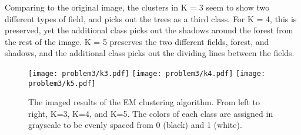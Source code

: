 \documentclass[12pt]{article}%
\begin{document}
\begin{itemize}
Comparing to the original image, the clusters in K = 3 seem to show two different types of field, and picks out the trees as a third class. For K = 4, this is preserved, yet the additional class picks out the shadows around the forest from the rest of the image. K = 5 preserves the two different fields, forest, and shadows, and the additional class picks out the dividing lines between the fields. 
\begin{figure*}
\centering
\texttt{[image: problem3/k3.pdf]}
\texttt{[image: problem3/k4.pdf]}
\vspace{0.1cm}
\texttt{[image: problem3/k5.pdf]}
\caption{The imaged results of the EM clustering algorithm. From left to right, K=3, K=4, and K=5. The colors of each class are assigned in grayscale to be evenly spaced from 0 (black) and 1 (white).}
\label{fig:EM}
\end{figure*}

\end{itemize}
\end{document}
